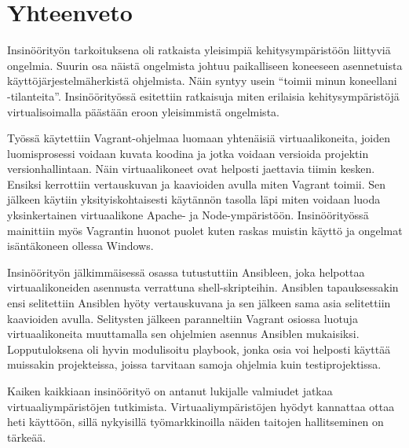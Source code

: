 \chapter{Yhteenveto}

Insinöörityön tarkoituksena oli ratkaista yleisimpiä kehitysympäristöön liittyviä ongelmia. Suurin osa näistä ongelmista johtuu paikalliseen koneeseen asennetuista käyttöjärjestelmäherkistä ohjelmista. Näin syntyy usein \enquote{toimii minun koneellani -tilanteita}. Insinöörityössä esitettiin ratkaisuja miten erilaisia kehitysympäristöjä virtualisoimalla päästään eroon yleisimmistä ongelmista.

Työssä käytettiin Vagrant-ohjelmaa luomaan yhtenäisiä virtuaalikoneita, joiden luomisprosessi voidaan kuvata koodina ja jotka voidaan versioida projektin versionhallintaan. Näin virtuaalikoneet ovat helposti jaettavia tiimin kesken. Ensiksi kerrottiin vertauskuvan ja kaavioiden avulla miten Vagrant toimii. Sen jälkeen käytiin yksityiskohtaisesti käytännön tasolla läpi miten voidaan luoda yksinkertainen virtuaalikone Apache- ja Node-ympäristöön. Insinöörityössä mainittiin myös Vagrantin huonot puolet kuten raskas muistin käyttö ja ongelmat isäntäkoneen ollessa Windows.

Insinöörityön jälkimmäisessä osassa tutustuttiin Ansibleen, joka helpottaa virtuaalikoneiden asennusta verrattuna shell-skripteihin. Ansiblen tapauksessakin ensi selitettiin Ansiblen hyöty vertauskuvana ja sen jälkeen sama asia selitettiin kaavioiden avulla. Selitysten jälkeen paranneltiin Vagrant osiossa luotuja virtuaalikoneita muuttamalla sen ohjelmien asennus Ansiblen mukaisiksi. Lopputuloksena oli  hyvin modulisoitu playbook, jonka osia voi helposti käyttää muissakin projekteissa, joissa tarvitaan samoja ohjelmia kuin testiprojektissa.

Kaiken kaikkiaan insinöörityö on antanut lukijalle valmiudet jatkaa virtuaaliympäristöjen tutkimista. Virtuaaliympäristöjen hyödyt kannattaa ottaa heti käyttöön, sillä nykyisillä työmarkkinoilla näiden taitojen hallitseminen on tärkeää.